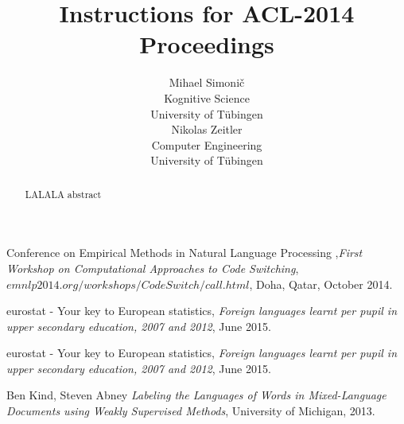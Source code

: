 \documentclass[11pt]{article}
\title{Instructions for ACL-2014 Proceedings}
\author{Mihael Simonič \\
  Kognitive Science \\ University of Tübingen 
  \\\And
  Nikolas Zeitler \\
  Computer Engineering  \\ University of Tübingen
  \\}
\date{}
\begin{document}
\maketitle
\begin{abstract}
LALALA abstract
\end{abstract}










\begin{thebibliography}{1}
Conference on Empirical Methods in Natural Language Processing ,\emph{First Workshop on Computational Approaches to Code Switching}, $emnlp2014.org/workshops/CodeSwitch/call.html$, Doha, Qatar, October 2014.


eurostat - Your key to European statistics, 
\emph{Foreign languages learnt per pupil in upper secondary education, 2007 and 2012}, June 2015.

eurostat - Your key to European statistics, 
\emph{Foreign languages learnt per pupil in upper secondary education, 2007 and 2012}, June 2015.

Ben Kind, Steven Abney
\emph{Labeling the Languages of Words in Mixed-Language Documents using Weakly Supervised Methods}, University of Michigan, 2013.


\end{thebibliography}
\end{document}
